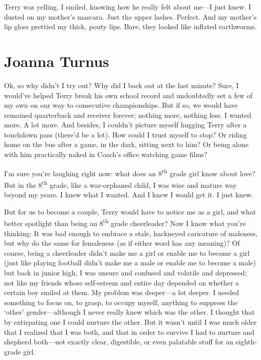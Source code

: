 Terry was yelling. I smiled, knowing how he really felt about me---I
just knew. I dusted on my mother's mascara. Just the upper lashes.
Perfect. And my mother's lip gloss prettied my thick, pouty lips. Bare,
they looked like inflated earthworms.

\chapter{Joanna Turnus}

\titlemark

Ok, so why didn't I try out? Why did I back out at the last minute?
Sure, I would've helped Terry break his own school record and
undoubtedly set a few of my own on our way to consecutive championships.
But if so, we would have remained quarterback and receiver forever;
nothing more, nothing less. I wanted more. A lot more. And besides, I
couldn't picture myself hugging Terry after a touchdown pass (there'd be
a lot). How could I trust myself to stop? Or riding home on the bus
after a game, in the dark, sitting next to him? Or being alone with him
practically naked in Coach's office watching game films?

I'm sure you're laughing right now: what does an 8\textsuperscript{th}
grade girl know about love? But in the 8\textsuperscript{th} grade, like
a war-orphaned child, I was wise and mature way beyond my years. I knew
what I wanted. And I knew I would get it. I just knew.

But for us to become a couple, Terry would have to notice me as a girl,
and what better spotlight than being an 8\textsuperscript{th} grade
cheerleader? Now I know what you're thinking: It was bad enough to
embrace a stale, hackneyed caricature of maleness, but why do the same
for femaleness (as if either word has any meaning)? Of course, being a
cheerleader didn't make me a girl or enable me to become a girl (just
like playing football didn't make me a male or enable me to become a
male) but back in junior high, I was unsure and confused and volatile
and depressed; not like my friends whose self-esteem and entire day
depended on whether a certain boy smiled at them. My problem was
deeper---a lot deeper. I needed something to focus on, to grasp, to
occupy myself, anything to suppress the `other' gender---although I
never really knew which was the other. I thought that by extirpating one
I could nurture the other. But it wasn't until I was much older that I
realized that I was both, and that in order to survive I had to nurture
and shepherd both---not exactly clear, digestible, or even palatable
stuff for an eighth-grade girl.

